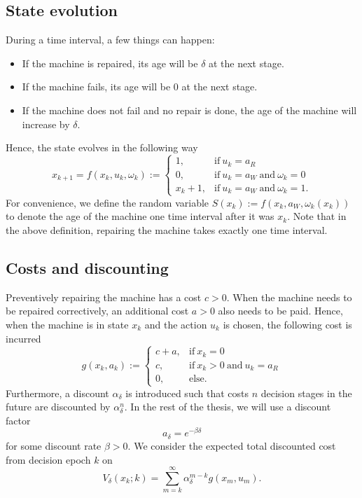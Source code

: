 \subsection{State evolution}
During a time interval, a few things can happen:
\begin{itemize}
	\item If the machine is repaired, its age will be $\delta$ at the next stage.
	\item If the machine fails, its age will be $0$ at the next stage.
	\item If the machine does not fail and no repair is done, the age of the machine will increase by $\delta$.
\end{itemize}
Hence, the state evolves in the following way
$$
x_{k+1}=f(x_k,u_k,\omega_k):=\begin{cases}
1,&\text{if}\ u_k=a_R \\
0,&\text{if}\ u_k=a_W\ \text{and}\ \omega_k=0 \\
x_k+1,&\text{if}\ u_k=a_W\ \text{and}\ \omega_k=1.
\end{cases}
$$
For convenience, we define the random variable $S(x_k):=f(x_k,a_W,\omega_k(x_k))$ to denote the age of the machine one time interval after it was $x_k$.
Note that in the above definition, repairing the machine takes exactly one time interval.

\subsection{Costs and discounting}
Preventively repairing the machine has a cost $c>0$.
When the machine needs to be repaired correctively, an additional cost $a>0$ also needs to be paid.
Hence, when the machine is in state $x_k$ and the action $u_k$ is chosen, the following cost is incurred
$$
g(x_k,a_k):=\begin{cases}
c+a,&\text{if}\ x_k=0 \\
c,&\text{if}\ x_k>0\ \text{and}\ u_k=a_R \\
0,&\text{else}.
\end{cases}
$$
Furthermore, a discount $\alpha_\delta$ is introduced such that costs $n$ decision stages in the future are discounted by $\alpha_\delta^n$.
In the rest of the thesis, we will use a discount factor
$$
a_\delta=e^{-\beta\delta}
$$
for some discount rate $\beta>0$.
We consider the expected total discounted cost from decision epoch $k$ on
$$
V_\delta(x_k;k)=\sum\limits_{m=k}^\infty \alpha_\delta^{m-k}g(x_m,u_m).
$$


